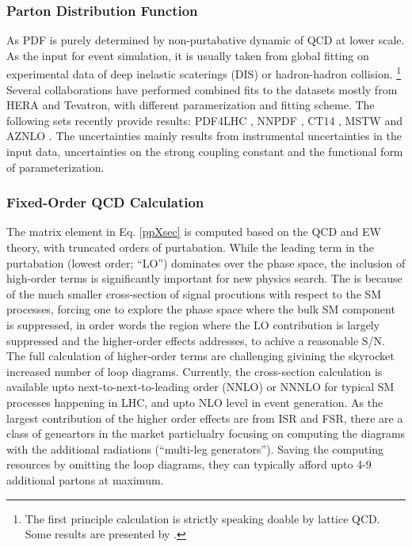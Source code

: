 \subsubsection{Parton Distribution Function}
As PDF is purely determined by non-purtabative dynamic of QCD at lower scale.
As the input for event simulation, it is usually taken from global fitting on experimental data of deep inelastic scaterings (DIS) or hadron-hadron collision.
\footnote{The first principle calculation is strictly speaking doable by lattice QCD. Some results are presented by \cite{latticePDF}.}
Several collaborations have performed combined fits to the datasets mostly from HERA and Tevatron, with different paramerization and fitting scheme. 
The following sets recently provide results: PDF4LHC \cite{PDF4LHC}, NNPDF \cite{NNPDF}, CT14 \cite{CT14}, MSTW \cite{MSTW} and AZNLO \cite{AZNLO}. 
The uncertainties mainly results from instrumental uncertainties in the input data, uncertainties on the strong coupling constant and the functional form of parameterization. 


\subsubsection{Fixed-Order QCD Calculation}
The matrix element in Eq. \ref{ppXsec} is computed based on the QCD and EW theory, with truncated orders of purtabation.
While the leading term in the purtabation (lowest order; ``LO'') dominates over the phase space, 
the inclusion of high-order terms is significantly important for new physics search.
The is because of the much smaller cross-section of signal procutions with respect to the SM processes,
forcing one to explore the phase space where the bulk SM component is suppressed, 
in order words the region where the LO contribution is largely suppressed and the higher-order effects addresses,
to achive a reasonable S/N. \\

The full calculation of higher-order terms are challenging givining the skyrocket increased number of loop diagrams.
Currently, the cross-section calculation is available upto next-to-next-to-leading order (NNLO) or NNNLO for typical SM processes happening in LHC, and upto NLO level in event generation. As the largest contribution of the higher order effects are from ISR and FSR, there are a class of geneartors in the market particlualry focusing on computing the diagrams with the additional radiations (``multi-leg generators''). Saving the computing resources by omitting the loop diagrams, they can typically afford upto 4-9 additional partons at maximum. \\


